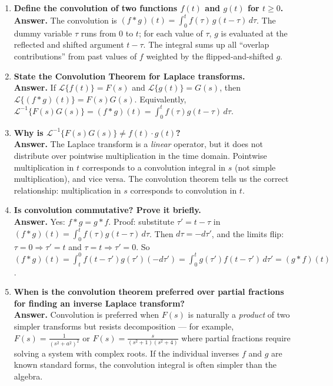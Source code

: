 \documentclass[12pt,a4paper]{article}
\begin{document}
\begin{enumerate}[label=\textbf{Q\arabic*.}, leftmargin=*, itemsep=10pt]

\item \textbf{Define the convolution of two functions $f(t)$ and $g(t)$ for $t\ge 0$.}\\
\textbf{Answer.} The convolution is
$(f*g)(t)=\int_0^t f(\tau)\,g(t-\tau)\,d\tau$.
The dummy variable $\tau$ runs from $0$ to $t$; for each value of $\tau$, $g$ is evaluated
at the reflected and shifted argument $t-\tau$. The integral sums up all ``overlap
contributions'' from past values of $f$ weighted by the flipped-and-shifted $g$.

\item \textbf{State the Convolution Theorem for Laplace transforms.}\\
\textbf{Answer.} If $\mathcal{L}\{f(t)\}=F(s)$ and $\mathcal{L}\{g(t)\}=G(s)$, then
$\mathcal{L}\{(f*g)(t)\}=F(s)G(s)$.
Equivalently, $\mathcal{L}^{-1}\{F(s)G(s)\}=(f*g)(t)=\int_0^t f(\tau)g(t-\tau)\,d\tau$.

\item \textbf{Why is $\mathcal{L}^{-1}\{F(s)G(s)\} \ne f(t)\cdot g(t)$?}\\
\textbf{Answer.} The Laplace transform is a \emph{linear} operator, but it does not
distribute over pointwise multiplication in the time domain. Pointwise multiplication in
$t$ corresponds to a convolution integral in $s$ (not simple multiplication), and vice
versa. The convolution theorem tells us the correct relationship: multiplication in $s$
corresponds to convolution in $t$.

\item \textbf{Is convolution commutative? Prove it briefly.}\\
\textbf{Answer.} Yes: $f*g = g*f$.
Proof: substitute $\tau' = t-\tau$ in $(f*g)(t)=\int_0^t f(\tau)g(t-\tau)\,d\tau$.
Then $d\tau=-d\tau'$, and the limits flip: $\tau=0\Rightarrow\tau'=t$ and $\tau=t\Rightarrow\tau'=0$.
So $(f*g)(t)=\int_t^0 f(t-\tau')g(\tau')(-d\tau')=\int_0^t g(\tau')f(t-\tau')\,d\tau'=(g*f)(t)$.

\item \textbf{When is the convolution theorem preferred over partial fractions for finding an inverse Laplace transform?}\\
\textbf{Answer.} Convolution is preferred when $F(s)$ is naturally a \emph{product} of two
simpler transforms but resists decomposition --- for example, $F(s)=\frac{1}{(s^2+a^2)^2}$
or $F(s)=\frac{s}{(s^2+1)(s^2+4)}$ where partial fractions require solving a system with
complex roots. If the individual inverses $f$ and $g$ are known standard forms, the
convolution integral is often simpler than the algebra.


\end{enumerate}
\end{document}
